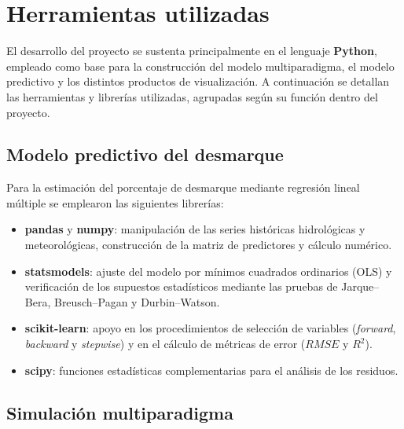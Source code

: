 \documentclass[12pt]{report}
\begin{document}
\section{Herramientas utilizadas}

El desarrollo del proyecto se sustenta principalmente en el lenguaje \textbf{Python}, empleado como base para la construcción del modelo multiparadigma, el modelo predictivo y los distintos productos de visualización. A continuación se detallan las herramientas y librerías utilizadas, agrupadas según su función dentro del proyecto.

\vspace{0.2cm}

\subsection*{Modelo predictivo del desmarque}

Para la estimación del porcentaje de desmarque mediante regresión lineal múltiple se emplearon las siguientes librerías:

\begin{itemize}
    \item \textbf{pandas} y \textbf{numpy}: manipulación de las series históricas hidrológicas y meteorológicas, construcción de la matriz de predictores y cálculo numérico.
    \item \textbf{statsmodels}: ajuste del modelo por mínimos cuadrados ordinarios (OLS) y verificación de los supuestos estadísticos mediante las pruebas de Jarque--Bera, Breusch--Pagan y Durbin--Watson.
    \item \textbf{scikit-learn}: apoyo en los procedimientos de selección de variables (\textit{forward}, \textit{backward} y \textit{stepwise}) y en el cálculo de métricas de error ($RMSE$ y $R^2$).
    \item \textbf{scipy}: funciones estadísticas complementarias para el análisis de los residuos.
\end{itemize}

\subsection*{Simulación multiparadigma}
\end{document}

